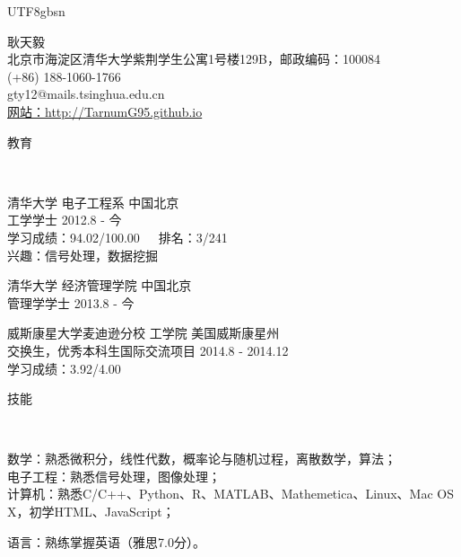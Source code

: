 \documentclass[9pt]{article}
\newenvironment{changemargin}[2]{%
  \begin{list}{}{%
    \setlength{\topsep}{0pt}%
    \setlength{\leftmargin}{#1}%
    \setlength{\rightmargin}{#2}%
    \setlength{\listparindent}{\parindent}%
    \setlength{\itemindent}{\parindent}%
    \setlength{\parsep}{\parskip}%
  }%
  \item[]}{\end{list}
}
\newcommand{\lineover}{
	\begin{changemargin}{-0.05in}{-0.05in}
		\vspace*{-8pt}
		\hrulefill \\
		\vspace*{-2pt}
	\end{changemargin}
}
\newcommand{\header}[1]{
	\begin{changemargin}{-0.5in}{-0.5in}
		\scshape{#1}\\
  	\lineover
	\end{changemargin}
}
\newcommand{\contact}[5]{
	\begin{changemargin}{-0.5in}{-0.5in}
		\begin{center}
			{\Large \scshape {#1}}\\ \smallskip
			{#2}\\ \smallskip 
			{#3}\\ \smallskip
			{#4}\\ \smallskip
			{#5}\smallskip
		\end{center}
	\end{changemargin}
}
\newenvironment{body} {
	\vspace*{-16pt}
	\begin{changemargin}{-0.25in}{-0.5in}
  }	
	{\end{changemargin}
}
\begin{document}
\begin{CJK*}{UTF8}{gbsn}

\contact{耿天毅}{北京市海淀区清华大学紫荆学生公寓1号楼129B，邮政编码：100084}{(+86) 188-1060-1766}{gty12@mails.tsinghua.edu.cn}{\href{http://TarnumG95.github.io}{网站：http://TarnumG95.github.io}}

\header{教育}

\begin{body}
	\vspace{14pt}

	清华大学 电子工程系 \hfill 中国北京 \\
工学学士 \hfill 2012.8 - 今 \\
学习成绩：94.02/100.00\ \ \ 排名：3/241\\
兴趣：信号处理，数据挖掘 \\
\vspace{6pt}

	清华大学 经济管理学院 \hfill 中国北京 \\
管理学学士 \hfill 2013.8 - 今 \\
\vspace{6pt}

	威斯康星大学麦迪逊分校 工学院 \hfill 美国威斯康星州 \\
交换生，优秀本科生国际交流项目 \hfill 2014.8 - 2014.12 \\
学习成绩：3.92/4.00

\end{body}

\smallskip
\smallskip
\smallskip

\header{技能}

\begin{body}
	\vspace{14pt}
	数学：熟悉微积分，线性代数，概率论与随机过程，离散数学，算法；\\
	\smallskip
	电子工程：熟悉信号处理，图像处理；\\
	\smallskip
	计算机：熟悉C/C++、Python、R、MATLAB、Mathemetica、Linux、Mac OS X，初学HTML、JavaScript；\\
	\smallskip

	语言：熟练掌握英语（雅思7.0分）。\\
\end{body}
\smallskip
\smallskip
\smallskip


\end{CJK*}
\end{document}
